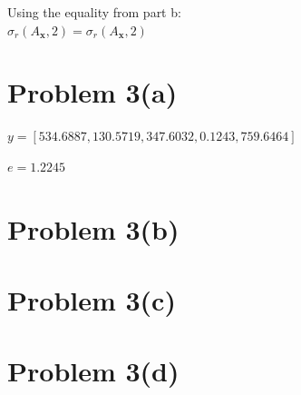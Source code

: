 \documentclass{article}
\begin{document}
Using the equality from part b:\\

$\sigma_r(A_\textbf{x}, 2) = \sigma_r(A_\textbf{x}, 2)$\\

\section*{Problem 3(a)}


$y = [534.6887, 130.5719, 347.6032, 0.1243, 759.6464]$

$e = 1.2245$

\section*{Problem 3(b)}

\section*{Problem 3(c)}


\section*{Problem 3(d)}

\end{document}
